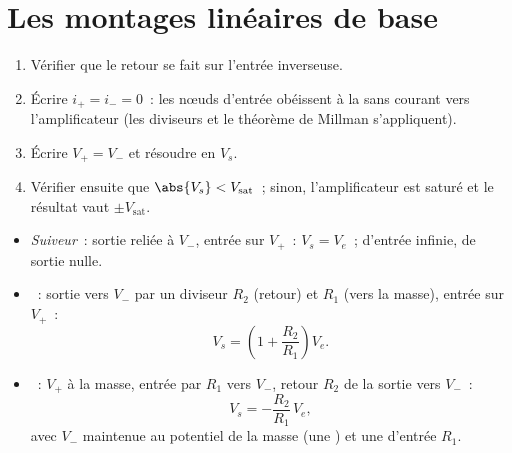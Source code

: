 \section{Les montages linéaires de base}

\begin{method}\label{met:b1:operational-amplifier:method}
\begin{enumerate}
  \item Vérifier que le retour se fait sur l'entrée inverseuse.
  \item Écrire $i_+ = i_- = 0$~: les nœuds d'entrée obéissent à la  sans courant vers l'amplificateur (les diviseurs et le
        théorème de Millman s'appliquent).
  \item Écrire $V_+ = V_-$ et résoudre en $V_s$.
  \item Vérifier ensuite que $\abs{V_s} < V_{\mathrm{sat}}$~; sinon,
        l'amplificateur est saturé et le résultat vaut $\pm V_{\mathrm{sat}}$.
\end{enumerate}
\end{method}

\begin{proposition}\label{prop:b1:operational-amplifier:basic}
\begin{itemize}
  \item \emph{Suiveur}~: sortie reliée à $V_-$, entrée sur $V_+$~:
        $V_s = V_e$~;  d'entrée infinie,  de sortie nulle.
  \item \emph{}~: sortie vers $V_-$ par un
        diviseur $R_2$ (retour) et $R_1$ (vers la masse), entrée sur $V_+$~:
        \[
        V_s = \left(1 + \frac{R_2}{R_1}\right)V_e .
        \]
  \item \emph{}~: $V_+$ à la masse, entrée par
        $R_1$ vers $V_-$, retour $R_2$ de la sortie vers $V_-$~:
        \[
        V_s = -\frac{R_2}{R_1}\,V_e ,
        \]
        avec $V_-$ maintenue au potentiel de la masse (une \emph{}) et une  d'entrée $R_1$.
\end{itemize}
\end{proposition}

